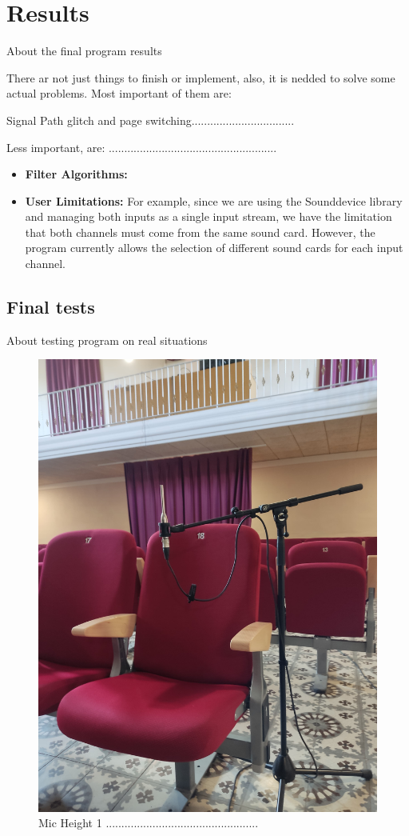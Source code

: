 \chapter{Results}

About the final program results

There ar not just things to finish or implement, also, it is nedded to solve some actual problems. Most important of them are:

Signal Path glitch and page switching.................................

Less important, are: ......................................................

\begin{itemize}
	\item \textbf{Filter Algorithms:}
	
	\item \textbf{User Limitations:} For example, since we are using the Sounddevice library and managing both inputs as a single input stream, we have the limitation that both channels must come from the same sound card. However, the program currently allows the selection of different sound cards for each input channel.
	
\end{itemize}

\section{Final tests}

About testing program on real situations


\begin{figure}[H]
	\centering
	\includegraphics[width=0.6
	\linewidth]{Figures/Coro_micpos1.jpeg}
	\caption{Mic Height 1 .................................................}
	\label{fig:Mic_pos1}
\end{figure}

